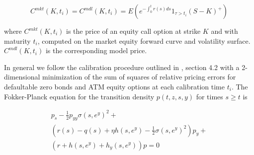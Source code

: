\begin{equation}\label{formula:convertible_equity_option_match}
C^{mkt}(K,t_i) = C^{mdl}(K,t_i) = E \left( e^{-\int_0^t r(s) ds} 1_{\tau > t_i} (S - K)^+ \right)
\end{equation}

where $C^{mkt}(K,t_i)$ is the price of an equity call option at strike $K$ and with maturity $t_i$, computed on the
market equity forward curve and volatility surface. $C^{mdl}(K,t_i)$ is the corresponding model price.

In general we follow the calibration procedure outlined in \cite{Andersen_Buffum_2002}, section 4.2 with a 2-dimensional
minimization of the sum of squares of relative pricing errors for defaultable zero bonds and ATM equity options at each
calibration time $t_i$. The Fokker-Planck equation for the transition density $p(t,z,s,y)$ for times $s\geq t$ is

\begin{eqnarray}\label{formula:convertible_fokker_planck}
  p_s - \frac{1}{2} p_{yy} \sigma(s,e^y)^2 + \\
        \left( r(s)-q(s)+\eta h(s,e^y)-\frac{1}{2} \sigma(s,e^y)^2 \right) p_y + \\
        \left( r + h(s,e^y) + h_y(s,e^y) \right) p = 0
\end{eqnarray}

